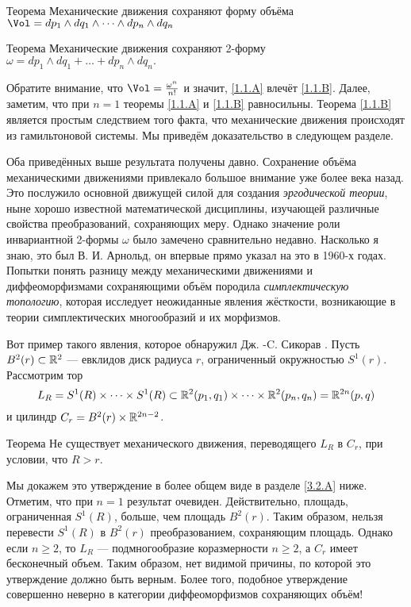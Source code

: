 \begin{thm}{Теорема}\label{1.1.A}
Механические движения сохраняют форму объёма 
$\Vol=dp_1\wedge dq_1\wedge\dots\wedge d p_n\wedge dq_n$
\end{thm}

\begin{thm}{Теорема}\label{1.1.B}
Механические движения сохраняют 2-форму $\omega = dp_1 \wedge dq_1 +\dots
+ dp_n \wedge dq_n.$
\end{thm}

Обратите внимание, что $\Vol = \tfrac{\omega^n}{n!}$ и значит, \ref{1.1.A} влечёт \ref{1.1.B}.
Далее, заметим, что при $n = 1$ теоремы \ref{1.1.A} и \ref{1.1.B} равносильны.
Теорема \ref{1.1.B} является простым следствием того факта, что механические движения происходят из гамильтоновой системы.
Мы приведём доказательство в следующем разделе.

Оба приведённых выше результата получены давно.
Сохранение объёма механическими движениями привлекало большое внимание уже более века назад.
Это послужило основной движущей силой для создания \emph{эргодической теории}, ныне хорошо известной математической дисциплины, изучающей различные свойства  преобразований, сохраняющих меру.
Однако значение роли инвариантной 2-формы $\omega$ было замечено сравнительно недавно.
Насколько я знаю, это был В. И. Арнольд, он впервые прямо указал на это в 1960-х годах.
Попытки понять разницу между механическими движениями и диффеоморфизмами сохраняющими объём породила \emph{симплектическую топологию}, которая исследует неожиданные явления жёсткости, возникающие в теории симплектических многообразий и их морфизмов.

Вот пример такого явления, которое обнаружил Дж. -C. Сикорав \cite{S1}.
Пусть $B^2(r) \subset \mathbb{R}^2$ --- евклидов диск радиуса $r$, ограниченный окружностью $S^1(r)$.
Рассмотрим тор 
\[L_R = 
S^1 (R) \times\dots\times S^1(R) \subset \mathbb{R}^2 (p_1, q_1) \times\dots\times \mathbb{R}^2 (p_n, q_n) =\mathbb{R}^{2n} (p, q)\]
и цилиндр $C_r = B^2 (r) \times \mathbb{R}^{2n-2}$.

\begin{thm}{Теорема}\label{1.1.C}
Не существует механического движения, переводящего $L_R$ в $C_r$, при условии, что $R>r$.
\end{thm}

Мы докажем это утверждение в более общем виде в разделе \ref{3.2.A} ниже.
Отметим, что при $n = 1$ результат очевиден.
Действительно, площадь, ограниченная $S^1 (R)$, больше, чем площадь $B^2 (r)$.
Таким образом, нельзя перевести $S^1(R)$ в $B^2(r)$ преобразованием, сохраняющим площадь.
Однако если $n \ge 2$, то $L_R$ --- подмногообразие коразмерности $n \ge 2$, а $C_r$ имеет бесконечный объем.
Таким образом, нет видимой причины, по которой это утверждение должно быть верным.
Более того, подобное утверждение совершенно неверно в категории диффеоморфизмов сохраняющих объём!


